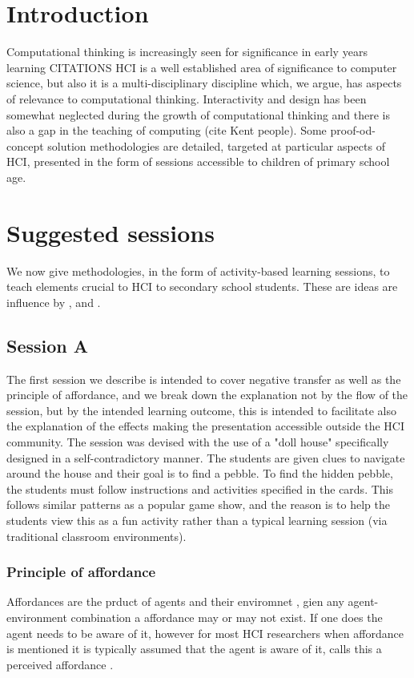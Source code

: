 \documentclass{sig-alternate}
\begin{document}
\section{Introduction}
Computational thinking is increasingly seen for significance in early years learning CITATIONS
HCI is a well established area of significance to computer science, but also it is a multi-disciplinary discipline which, we argue, has aspects of relevance to computational thinking. Interactivity and design has been somewhat neglected during the growth of computational thinking and there is also a gap in the teaching of computing (cite Kent people). Some proof-od-concept solution methodologies are detailed, targeted at particular aspects of HCI, presented in the form of sessions accessible to children of primary school age.




 
\section{Suggested sessions}
We now give methodologies, in the form of activity-based learning sessions, to teach elements crucial to HCI to secondary school students. These are ideas are influence by \cite{normanDesign}, \cite{rogers2011interaction} and \cite{shneiderman1986designing}.
\subsection{Session A}
The first session we describe is intended to cover negative transfer as well as the principle of affordance, and we break down the explanation not by the flow of the session, but by the intended learning outcome, this is intended to facilitate also the explanation of the effects making the presentation accessible outside the HCI community. The session was devised with the use of a "doll house" specifically designed in a self-contradictory manner. The students are given clues to navigate around the house and their goal is to find a pebble. To find the hidden pebble, the students must follow instructions and activities specified in the cards. This follows similar patterns as a popular game show, and the reason is to help the students view this as a fun activity rather than a typical learning session (via traditional classroom environments).

\subsubsection*{Principle of affordance}
Affordances are the prduct of agents and their enviromnet \cite{gibson1977theory}, gien any agent-environment combination a affordance may or may not exist. If one does the agent needs to be aware of it, however for most HCI researchers when affordance is mentioned it is typically assumed that the agent is aware of it,  calls this a perceived affordance \cite{norman1999affordance}.
\end{document}
